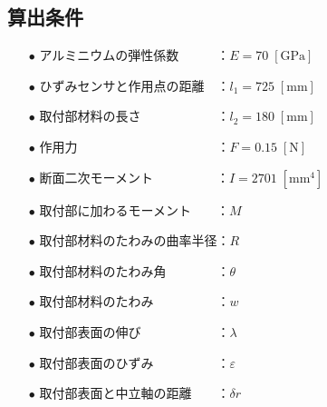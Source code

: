 \documentclass[twocolumn,a4j]{jsarticle}
\begin{document}
\subsection{算出条件}
\begin{screen}
    \begin{itemize}
        \item [$\bullet$] アルミニウムの弾性係数　　　：$E = 70 \;\left[\mathrm{GPa}\right]$
        \item [$\bullet$] ひずみセンサと作用点の距離　：$l_1 = 725 \;\left[\mathrm{mm}\right]$
        \item [$\bullet$] 取付部材料の長さ　　　　　　：$l_2 = 180 \;\left[\mathrm{mm}\right]$
        \item [$\bullet$] 作用力　　　　　　　　　　　：$F = 0.15 \;\left[\mathrm{N}\right]$              
        \item [$\bullet$] 断面二次モーメント　　　　　：$I = 2701 \;\left[\mathrm{mm^4}\right]$              
        \item [$\bullet$] 取付部に加わるモーメント　　：$M$              
        \item [$\bullet$] 取付部材料のたわみの曲率半径：$R$              
        \item [$\bullet$] 取付部材料のたわみ角　　　　：$\theta$
        \item [$\bullet$] 取付部材料のたわみ　　　　　：$w$
        \item [$\bullet$] 取付部表面の伸び　　　　　　：$\lambda$
        \item [$\bullet$] 取付部表面のひずみ　　　　　：$\varepsilon$
        \item [$\bullet$] 取付部表面と中立軸の距離　　：$\delta r$              
    \end{itemize}
\end{screen}
\newpage
\end{document}
